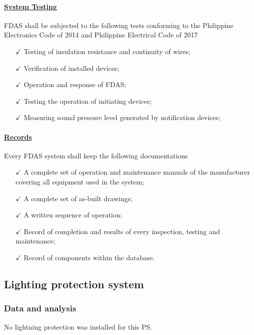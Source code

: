 \paragraph{\underline{System Testing }}

FDAS shall be subjected to the following tests conforming to the Philippine Electronics Code of 2014 and Philippine Electrical Code of 2017
\begin{itemize}%
	\item [$\checkmark$] Testing of insulation resistance and continuity of wires;
	\item [$\checkmark$] Verification of installed devices;
	\item [$\checkmark$] Operation and response of FDAS;
	\item [$\checkmark$] Testing the operation of initiating devices;
	\item [$\checkmark$] Measuring sound pressure level generated by notification devices;
\end{itemize}


\paragraph{\underline{Records }}

Every FDAS system shall keep the following documentations
\begin{itemize}%
	\item [$\checkmark$] A complete set of operation and maintenance manuals of the manufacturer covering all equipment used in the system;
	\item [$\checkmark$] A complete set of as-built drawings;
	\item [$\checkmark$] A written sequence of operation;
	\item [$\checkmark$] Record of completion and results of every inspection, testing and maintenance;
	\item [$\checkmark$] Record of components within the database.
\end{itemize}



\subsection{Lighting protection system} \label{ch04fdas02}
\subsubsection{Data and analysis}
No lightning protection was installed for this PS.

